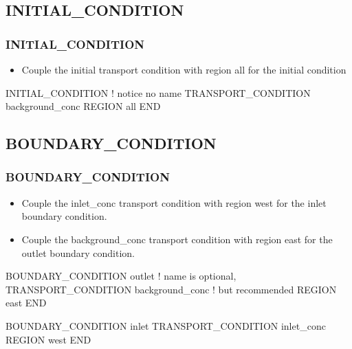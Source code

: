 \documentclass{beamer}
\newcommand\redcomment[1]{{{\color{red} #1}}}
\newcommand\bluecomment[1]{{{\color{blue} #1}}}
\newcommand\greencomment[1]{{{\color{green} #1}}}
\begin{document}
\subsection{INITIAL\_CONDITION}

\begin{frame}[fragile]\frametitle{INITIAL\_CONDITION}

\begin{itemize}
\item Couple the \greencomment{initial} transport condition with region \greencomment{all} for the initial condition
\end{itemize}

\begin{semiverbatim}

INITIAL_CONDITION               \bluecomment{! notice no name}
  TRANSPORT_CONDITION background_conc
  REGION all
END

\end{semiverbatim}

\end{frame}

\subsection{BOUNDARY\_CONDITION}

\begin{frame}[fragile]\frametitle{BOUNDARY\_CONDITION}

\begin{itemize}
\item Couple the \greencomment{inlet\_conc} transport condition with region \greencomment{west} for the \redcomment{inlet} boundary condition.
\item Couple the \greencomment{background\_conc} transport condition with region \greencomment{east} for the \redcomment{outlet} boundary condition.
\end{itemize}

\begin{semiverbatim}

BOUNDARY_CONDITION outlet             \bluecomment{! name is optional,}
  TRANSPORT_CONDITION background_conc \bluecomment{!   but recommended}
  REGION east
END

BOUNDARY_CONDITION inlet
  TRANSPORT_CONDITION inlet_conc
  REGION west
END

\end{semiverbatim}

\end{frame}
\end{document}
